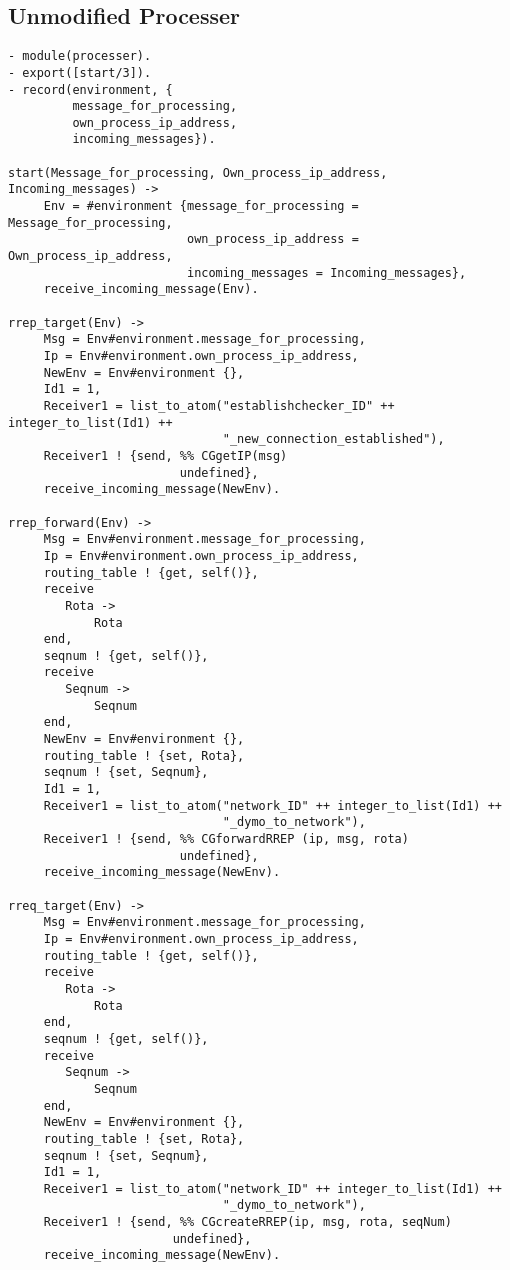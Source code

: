 \subsection*{Unmodified Processer}

\footnotesize
\begin{verbatim}
- module(processer).
- export([start/3]).
- record(environment, {
         message_for_processing,
         own_process_ip_address,
         incoming_messages}).

start(Message_for_processing, Own_process_ip_address, Incoming_messages) -> 
     Env = #environment {message_for_processing = Message_for_processing, 
                         own_process_ip_address = Own_process_ip_address, 
                         incoming_messages = Incoming_messages},
     receive_incoming_message(Env).

rrep_target(Env) -> 
     Msg = Env#environment.message_for_processing,
     Ip = Env#environment.own_process_ip_address,
     NewEnv = Env#environment {},
     Id1 = 1,
     Receiver1 = list_to_atom("establishchecker_ID" ++  integer_to_list(Id1) ++ 
                              "_new_connection_established"),
     Receiver1 ! {send, %% CGgetIP(msg)
                        undefined},
     receive_incoming_message(NewEnv).

rrep_forward(Env) -> 
     Msg = Env#environment.message_for_processing,
     Ip = Env#environment.own_process_ip_address,
     routing_table ! {get, self()},
     receive 
        Rota -> 
            Rota
     end,
     seqnum ! {get, self()},
     receive 
        Seqnum -> 
            Seqnum
     end,
     NewEnv = Env#environment {},
     routing_table ! {set, Rota},
     seqnum ! {set, Seqnum},
     Id1 = 1,
     Receiver1 = list_to_atom("network_ID" ++ integer_to_list(Id1) ++
                              "_dymo_to_network"),
     Receiver1 ! {send, %% CGforwardRREP (ip, msg, rota)
                        undefined},
     receive_incoming_message(NewEnv).

rreq_target(Env) -> 
     Msg = Env#environment.message_for_processing,
     Ip = Env#environment.own_process_ip_address,
     routing_table ! {get, self()},
     receive 
        Rota -> 
            Rota
     end,
     seqnum ! {get, self()},
     receive 
        Seqnum -> 
            Seqnum
     end,
     NewEnv = Env#environment {},
     routing_table ! {set, Rota},
     seqnum ! {set, Seqnum},
     Id1 = 1,
     Receiver1 = list_to_atom("network_ID" ++ integer_to_list(Id1) ++ 
                              "_dymo_to_network"),
     Receiver1 ! {send, %% CGcreateRREP(ip, msg, rota, seqNum)
                       undefined},
     receive_incoming_message(NewEnv).


\end{verbatim}
